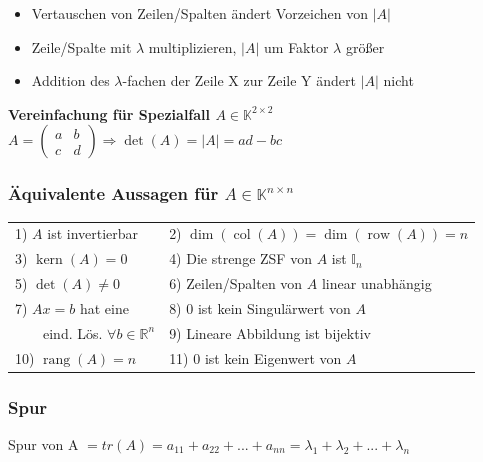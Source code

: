 \documentclass[6pt,a4paper]{scrartcl}
\DeclareMathOperator{\Kern}{kern}
\DeclareMathOperator{\rang}{rang}
\DeclareMathOperator{\col}{col}
\DeclareMathOperator{\row}{row}
\begin{document}
\begin{multicols*}{4}
				\begin{itemize}\itemsep0pt
					\item Vertauschen von Zeilen/Spalten ändert Vorzeichen von $|A|$
					\item Zeile/Spalte mit $\lambda$ multiplizieren, $|A|$ um Faktor $\lambda$ größer
					\item Addition des $\lambda$-fachen der Zeile X zur Zeile Y ändert $|A|$ nicht 
				\end{itemize}
				\textbf{Vereinfachung für Spezialfall $A\in \mathbb K^{2\times 2}$}\\
				$A=\begin{pmatrix}a&b\\c&d\end{pmatrix} \Rightarrow \det(A)=|A|=ad-bc$

			\subsubsection{Äquivalente Aussagen für $A\in \mathbb K^{n\times n}$}
				\begin{tabular}{ll}
					1)  $A$ ist invertierbar & 2) $\dim(\col(A))=\dim(\row(A))=n$\\
					3)  $\Kern(A)={0}$ & 4) Die strenge ZSF von $A$ ist $\mathbb{I}_n$\\
					5) $\det(A)\ne0$ & 6) Zeilen/Spalten von $A$ linear unabhängig\\
					7) $Ax=b$ hat eine & 8) 0 ist kein Singulärwert von $A$\\\ \ \ \ eind. Lös. $\forall b\in\mathbb{R}^n$ & 9) Lineare Abbildung ist bijektiv\\
					10)  $\rang(A)=n$ & 11) 0 ist kein Eigenwert von $A$\\

				\end{tabular}			
			
			\subsubsection{Spur}
  			Spur von A $= tr(A)=a_{11} +a_{22} +...+a_{nn} =\lambda_{1} +\lambda_{2} +...+\lambda_{n}$

    


\end{multicols*}

\end{document}
